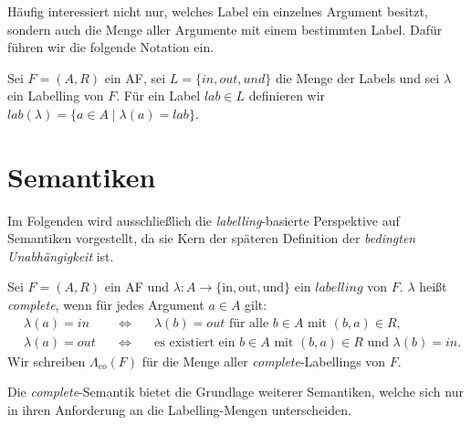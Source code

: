 Häufig interessiert nicht nur, welches Label ein einzelnes Argument besitzt,
sondern auch die Menge aller Argumente mit einem bestimmten Label. Dafür führen
wir die folgende Notation ein.
\begin{Definition}
      \label{def:labelling-set}
      Sei \(F=(A,R)\) ein AF, sei
      \(L=\{\mathit{in},\mathit{out},\mathit{und}\}\)
      die Menge der Labels und sei \(\lambda\) ein Labelling von \(F\).
      Für ein Label \(lab\in L\) definieren wir
      \(lab(\lambda)=\{a\in A\mid \lambda(a)=lab\}.\)
\end{Definition}
\newpage
\section{Semantiken}
\label{sec:af-semantiken}
Im Folgenden wird ausschließlich die \emph{labelling}-basierte Perspektive auf Semantiken vorgestellt, da sie Kern der 
späteren Definition der \emph{bedingten Unabhängigkeit} ist.

\begin{Definition}
      \label{def:complete-labelling}
      Sei $F = (A, R)$ ein AF und $\lambda : A \rightarrow \{\text{in}, \text{out}, \text{und}\}$ ein $labelling$
      von $F$. $\lambda$ heißt \emph{complete}, wenn für jedes Argument $a \in A$ gilt:
      \[
            \begin{alignedat}{2}
            &\lambda(a)=\mathit{in}
            &\quad\Longleftrightarrow\quad&
            \lambda(b)=\mathit{out}
            \text{ für alle } b\in A \text{ mit } (b,a)\in R,\\
            &\lambda(a)=\mathit{out}
            &\quad\Longleftrightarrow\quad&
            \text{es existiert ein } b\in A \text{ mit } (b,a)\in R
            \text{ und } \lambda(b)=\mathit{in}.
            \end{alignedat}
      \]
      Wir schreiben \(\Lambda_{co}(F)\) für die Menge aller \emph{complete}-Labellings von $F$.
\end{Definition}
Die \emph{complete}-Semantik bietet die Grundlage weiterer Semantiken, welche sich nur in ihren Anforderung an die Labelling-Mengen
unterscheiden.

